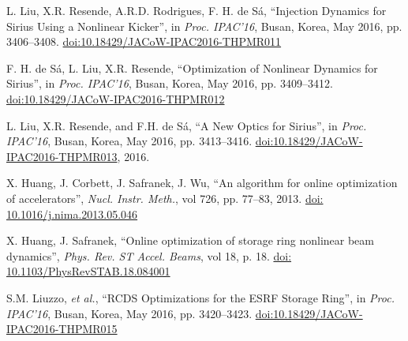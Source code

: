 \documentclass[a4paper,
               keeplastbox,   %
               ]{jacow}
\begin{document}
	\begin{thebibliography}{9} %
	
        

        L. Liu, X.R. Resende, A.R.D. Rodrigues, F. H. de Sá,
       \textquotedblleft{{I}njection {D}ynamics for {S}irius {U}sing a {N}onlinear {K}icker}\textquotedblright,
       in \emph{Proc. IPAC’16}, Busan, Korea, May 2016, pp. 3406--3408.
       \url{doi:10.18429/JACoW-IPAC2016-THPMR011} 
 
        F. H. de Sá, L. Liu, X.R. Resende,
       \textquotedblleft{{O}ptimization of {N}onlinear {D}ynamics for {S}irius}\textquotedblright,
       in \emph{Proc. IPAC’16}, Busan, Korea, May 2016, pp. 3409--3412.
       \url{doi:10.18429/JACoW-IPAC2016-THPMR012}

       L. Liu, X.R. Resende, and F.H. de Sá,
       \textquotedblleft{A New Optics for Sirius}\textquotedblright,
     in \emph{Proc. IPAC'16}, Busan, Korea, May 2016, pp. 3413--3416.
       \url{doi:10.18429/JACoW-IPAC2016-THPMR013}, 2016.
           
		X. Huang, J. Corbett, J. Safranek, J. Wu,
		\textquotedblleft{An algorithm for online optimization of accelerators}\textquotedblright,
		\emph{Nucl.  Instr. Meth.}, vol 726, pp. 77--83, 2013.
        \url{doi: 10.1016/j.nima.2013.05.046}

		X. Huang, J. Safranek,
		\textquotedblleft{Online optimization of storage ring nonlinear beam dynamics}\textquotedblright,
		\emph{Phys. Rev. ST Accel. Beams}, vol 18, p. 18.
        \url{doi: 10.1103/PhysRevSTAB.18.084001} 
 
        S.M. Liuzzo, \emph{et al.},
        \textquotedblleft{RCDS Optimizations for the ESRF Storage Ring}\textquotedblright,
        in \emph{Proc. IPAC’16}, Busan, Korea, May 2016, pp. 3420--3423.
       \url{doi:10.18429/JACoW-IPAC2016-THPMR015}   
    

\end{thebibliography}
\end{document}
